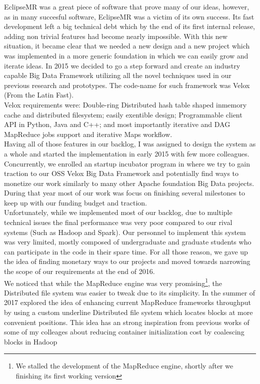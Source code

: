 EclipseMR was a great piece of software that prove many of our ideas, however, as in many succesful software, EclipseMR was a victim of its own success. Its fast development left a big technical debt which by the end of its first internal release, adding non trivial features had become nearly impossible. 
With this new situation, it became clear that we needed a new design and a new project which was implemented in a more generic foundation in which we can easily grow and iterate ideas. In 2015 we decided to go a step forward and create an industry capable Big Data Framework utilizing all the novel techniques used in our previous research and prototypes. The code-name for such framework was Velox (From the Latin Fast). \\
Velox requirements were: Double-ring Distributed hash table shaped inmemory cache and distributed filesystem; easily exentible design; Programmable client API in Python, Java and C++; and most importantly iterative and DAG MapReduce jobs support and iterative Maps workflow. \\

Having all of those features in our backlog, I was assigned to design the system as a whole and started the implementation in early 2015 with few more colleagues. Concurrently, we enrolled an startup incubator program in where we try to gain traction to our OSS Velox Big Data Framework and potentially find ways to monetize our work similarly to many other Apache foundation Big Data projects. \\
During that year most of our work was focus on finishing several milestones to keep up with our funding budget and traction. \\

Unfortunately, while we implemented most of our backlog, due to multiple technical issues the final performance was very poor compared to our rival systems (Such as Hadoop and Spark). Our personnel to implement this system was very limited, mostly composed of undergraduate and graduate students who can participate in the code in their spare time. For all those reason, we gave up the idea of finding monetary ways to our projects and moved towards narrowing the scope of our requirements at the end of 2016. \\

We noticed that while the MapReduce engine was very promising\footnote{We stalled the development of the MapReduce engine, shortly after we finishing its first working version}, the Distributed file system was easier to tweak due to its simplicity. In the summer of 2017 explored the idea of enhancing current MapReduce frameworks throughput by using a custom underline Distributed file system which locates blocks at more convenient positions. This idea has an strong inspiration from previous works of some of my colleages about reducing container initialization cost by coalescing blocks in Hadoop\cite{kim2017coalescing}\\

